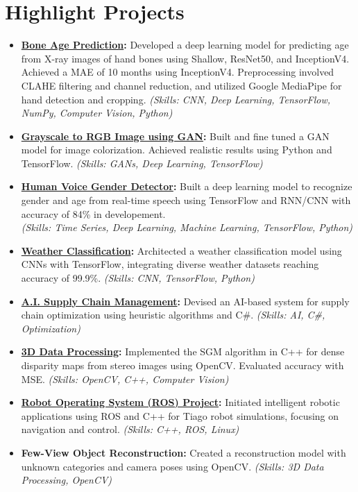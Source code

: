 \documentclass[a4paper]{article}
\begin{document}
\section*{Highlight Projects}
\begin{itemize}[left=0pt]
	\item \textbf{\href{https://github.com/PooyaNasiri/bone-age-prediction}{Bone Age Prediction}:} Developed a deep learning model for predicting age from X-ray images of hand bones using Shallow, ResNet50, and InceptionV4. Achieved a MAE of 10 months using InceptionV4. Preprocessing involved CLAHE filtering and channel reduction, and utilized Google MediaPipe for hand detection and cropping. \textit{(Skills: CNN, Deep Learning, TensorFlow, NumPy, Computer Vision, Python)}
    \item \textbf{\href{https://github.com/PooyaNasiri/GrayScale2RGB-GAN-Model}{Grayscale to RGB Image using GAN}:} Built and fine tuned a GAN model for image colorization. Achieved realistic results using Python and TensorFlow. \textit{(Skills: GANs, Deep Learning, TensorFlow)}
    \item \textbf{\href{https://github.com/PooyaNasiri/Human-Voice-Gender-Detector}{Human Voice Gender Detector}:} Built a deep learning model to recognize gender and age from real-time speech using TensorFlow and RNN/CNN with accuracy of 84\% in developement. \\ \textit{(Skills: Time Series, Deep Learning, Machine Learning, TensorFlow, Python)}
    \item \textbf{\href{https://github.com/PooyaNasiri/Weather-Classification}{Weather Classification}:} Architected a weather classification model using CNNs with TensorFlow, integrating diverse weather datasets reaching accuracy of 99.9\%. \textit{(Skills: CNN, TensorFlow, Python)}
    \item \textbf{\href{https://github.com/PooyaNasiri/ai_supplychain_management}{A.I. Supply Chain Management}:} Devised an AI-based system for supply chain optimization using heuristic algorithms and C\#. \textit{(Skills: AI, C\#, Optimization)}
    \item \textbf{\href{https://github.com/PooyaNasiri/3D-Data-Processing}{3D Data Processing}:} Implemented the SGM algorithm in C++ for dense disparity maps from stereo images using OpenCV. Evaluated accuracy with MSE. \textit{(Skills: OpenCV, C++, Computer Vision)}
    \item \textbf{\href{https://github.com/PooyaNasiri/ROS-Intelligent-Robotics}{Robot Operating System (ROS) Project}:} Initiated intelligent robotic applications using ROS and C++ for Tiago robot simulations, focusing on navigation and control. \textit{(Skills: C++, ROS, Linux)}
    \item \textbf{Few-View Object Reconstruction:} Created a reconstruction model with unknown categories and camera poses using OpenCV. \textit{(Skills: 3D Data Processing, OpenCV)}
  

\end{itemize}
\end{document}
